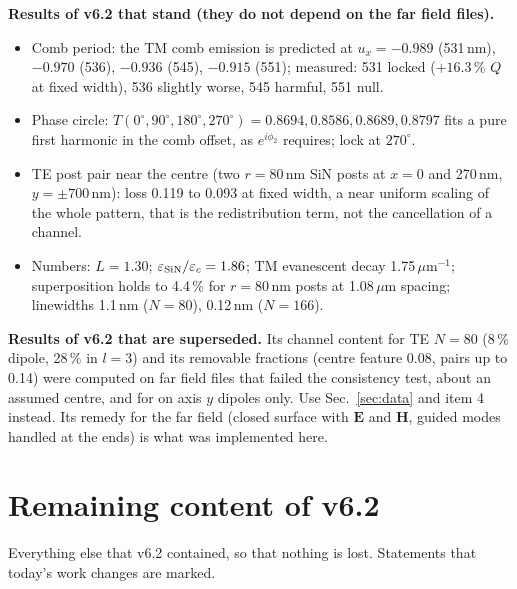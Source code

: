 \documentclass[11pt,a4paper]{article}
\begin{document}
\textbf{Results of v6.2 that stand (they do not depend on the far field files).}
\begin{itemize}
\item Comb period: the TM comb emission is predicted at $u_x=-0.989$ (531\,nm), $-0.970$ (536), $-0.936$ (545),
$-0.915$ (551); measured: 531 locked ($+16.3\,\%$ $Q$ at fixed width), 536 slightly worse, 545 harmful, 551 null.
\item Phase circle: $T(0^\circ,90^\circ,180^\circ,270^\circ)=0.8694,0.8586,0.8689,0.8797$ fits a pure first
harmonic in the comb offset, as $e^{i\phi_2}$ requires; lock at $270^\circ$.
\item TE post pair near the centre (two $r=80$\,nm SiN posts at $x=0$ and 270\,nm, $y=\pm700$\,nm): loss 0.119 to
0.093 at fixed width, a near uniform scaling of the whole pattern, that is the redistribution term, not the
cancellation of a channel.
\item Numbers: $L=1.30$; $\varepsilon_{\rm SiN}/\varepsilon_c=1.86$; TM evanescent decay 1.75\,$\mu$m$^{-1}$;
superposition holds to 4.4\,\% for $r=80$\,nm posts at 1.08\,$\mu$m spacing; linewidths 1.1\,nm ($N=80$),
0.12\,nm ($N=166$).
\end{itemize}
\textbf{Results of v6.2 that are superseded.} Its channel content for TE $N=80$ (8\,\% dipole, 28\,\% in $l=3$) and
its removable fractions (centre feature 0.08, pairs up to 0.14) were computed on far field files that failed the
consistency test, about an assumed centre, and for on axis $y$ dipoles only. Use Sec.~\ref{sec:data} and item 4
instead. Its remedy for the far field (closed surface with $\mathbf E$ and $\mathbf H$, guided modes handled at
the ends) is what was implemented here.

\section{Remaining content of v6.2}
Everything else that v6.2 contained, so that nothing is lost. Statements that today's work changes are marked.
\end{document}
